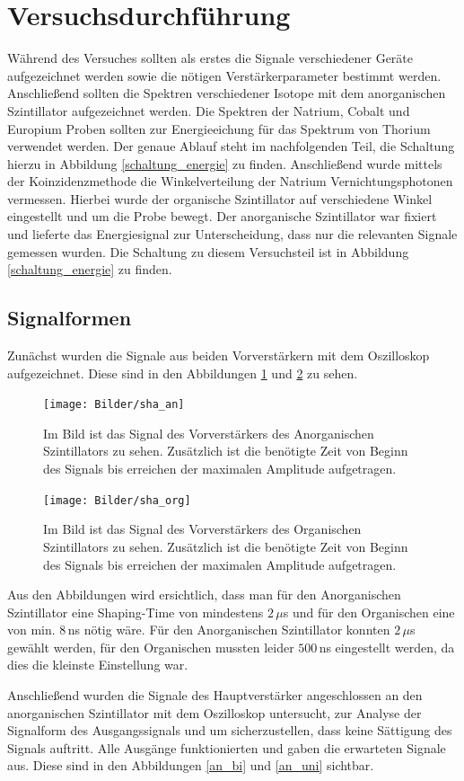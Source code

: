 \section{Versuchsdurchführung}
Während des Versuches sollten als erstes die Signale verschiedener Geräte aufgezeichnet werden sowie die nötigen Verstärkerparameter bestimmt werden. Anschließend sollten die Spektren verschiedener Isotope mit dem anorganischen Szintillator aufgezeichnet werden. Die Spektren der Natrium, Cobalt und Europium Proben sollten zur Energieeichung für das Spektrum von Thorium verwendet werden. Der genaue Ablauf steht im nachfolgenden Teil, die Schaltung hierzu in Abbildung \ref{schaltung_energie} zu finden. Anschließend wurde mittels der Koinzidenzmethode die Winkelverteilung der Natrium Vernichtungsphotonen vermessen. Hierbei wurde der organische Szintillator auf verschiedene Winkel eingestellt und um die Probe bewegt. Der anorganische Szintillator war fixiert und lieferte das Energiesignal zur Unterscheidung, dass nur die relevanten Signale gemessen wurden. Die Schaltung zu diesem Versuchsteil ist in Abbildung \ref{schaltung_energie} zu finden.
\subsection{Signalformen}
Zunächst wurden die Signale aus beiden Vorverstärkern mit dem Oszilloskop aufgezeichnet. Diese sind in den Abbildungen \ref{vv_anorg} und \ref{vv_org}  zu sehen. 

\begin{figure}[h]
	\centering
	\texttt{[image: Bilder/sha\_an]}
	\caption[Signal des NaJ Preamp.]{\small Im Bild ist das Signal des Vorverstärkers des Anorganischen Szintillators zu sehen. Zusätzlich ist die benötigte Zeit von Beginn des Signals bis erreichen der maximalen Amplitude aufgetragen.}
	\label{vv_anorg}
\end{figure} 

\begin{figure}[h]
		\centering
	\texttt{[image: Bilder/sha\_org]}
	\caption[Signal des Organischen Preamp.]{\small Im Bild ist das Signal des Vorverstärkers des Organischen Szintillators zu sehen. Zusätzlich ist die benötigte Zeit von Beginn des Signals bis erreichen der maximalen Amplitude aufgetragen.}
	\label{vv_org}
\end{figure}

Aus den Abbildungen wird ersichtlich, dass man für den Anorganischen Szintillator eine Shaping-Time von mindestens $2\,\mu$s und für den Organischen eine von min. $8\,$ns nötig wäre. Für den Anorganischen Szintillator konnten $2\,\mu$s gewählt werden, für den Organischen mussten leider $500\,$ns eingestellt werden, da dies die kleinste Einstellung war.\par
Anschließend wurden die Signale des Hauptverstärker angeschlossen an den anorganischen Szintillator mit dem Oszilloskop untersucht, zur Analyse der Signalform des Ausgangssignals und um sicherzustellen, dass keine Sättigung des Signals auftritt. Alle Ausgänge funktionierten und gaben die erwarteten Signale aus. Diese sind in den Abbildungen \ref{an_bi} und \ref{an_uni} sichtbar.

